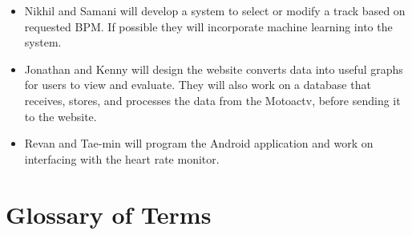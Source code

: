 \documentclass[letterpaper,english]{scrreprt}
\begin{document}
\begin{itemize}
	\item Nikhil and Samani will develop a system to select or modify a track based on requested BPM. If possible they will incorporate machine learning into the system.
	\item Jonathan and Kenny will design the website converts data into useful graphs for users to view and evaluate. They will also work on a database that receives, stores, and processes the data from the Motoactv, before sending it to the website.
	\item Revan and Tae-min will program the Android application and work on interfacing with the heart rate monitor.
\end{itemize}

\section{Glossary of Terms}
\end{document}
